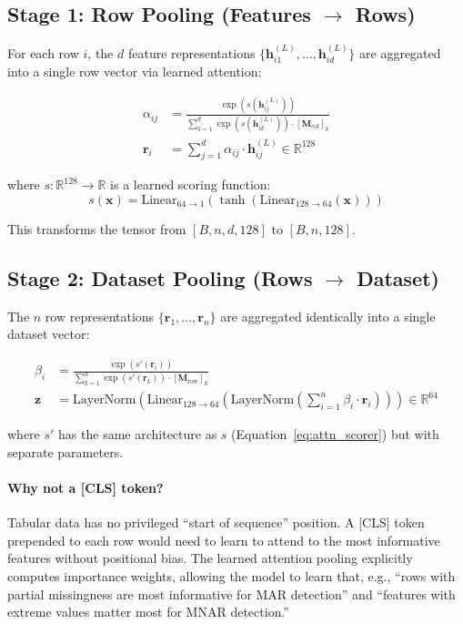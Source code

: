 \documentclass[11pt]{article}
\newcommand{\RR}{\mathbb{R}}
\newcommand{\layernorm}{\text{LayerNorm}}
\begin{document}
\subsection{Stage 1: Row Pooling (Features $\to$ Rows)}

For each row $i$, the $d$ feature representations $\{\mathbf{h}^{(L)}_{i1}, \ldots, \mathbf{h}^{(L)}_{id}\}$ are aggregated into a single row vector via learned attention:

\begin{align}
\alpha_{ij} &= \frac{\exp\!\left(s(\mathbf{h}^{(L)}_{ij})\right)}{\sum_{k=1}^{d} \exp\!\left(s(\mathbf{h}^{(L)}_{ik})\right) \cdot [\mathbf{M}_{\text{col}}]_k} \label{eq:row_pool_weights} \\
\mathbf{r}_i &= \sum_{j=1}^{d} \alpha_{ij} \cdot \mathbf{h}^{(L)}_{ij} \in \RR^{128} \label{eq:row_pool}
\end{align}

where $s: \RR^{128} \to \RR$ is a learned scoring function:
\begin{equation}
s(\mathbf{x}) = \text{Linear}_{64 \to 1}\!\left(\tanh\!\left(\text{Linear}_{128 \to 64}(\mathbf{x})\right)\right)
\label{eq:attn_scorer}
\end{equation}

This transforms the tensor from $[B, n, d, 128]$ to $[B, n, 128]$.

\subsection{Stage 2: Dataset Pooling (Rows $\to$ Dataset)}

The $n$ row representations $\{\mathbf{r}_1, \ldots, \mathbf{r}_n\}$ are aggregated identically into a single dataset vector:

\begin{align}
\beta_i &= \frac{\exp\!\left(s'(\mathbf{r}_i)\right)}{\sum_{k=1}^{n} \exp\!\left(s'(\mathbf{r}_k)\right) \cdot [\mathbf{M}_{\text{row}}]_k} \label{eq:dataset_pool_weights} \\
\mathbf{z} &= \layernorm\!\left(\text{Linear}_{128 \to 64}\!\left(\layernorm\!\left(\sum_{i=1}^{n} \beta_i \cdot \mathbf{r}_i\right)\right)\right) \in \RR^{64} \label{eq:evidence}
\end{align}

where $s'$ has the same architecture as $s$ (Equation~\ref{eq:attn_scorer}) but with separate parameters.

\paragraph{Why not a [CLS] token?} Tabular data has no privileged ``start of sequence'' position. A [CLS] token prepended to each row would need to learn to attend to the most informative features without positional bias. The learned attention pooling explicitly computes importance weights, allowing the model to learn that, e.g., ``rows with partial missingness are most informative for MAR detection'' and ``features with extreme values matter most for MNAR detection.''
\end{document}
